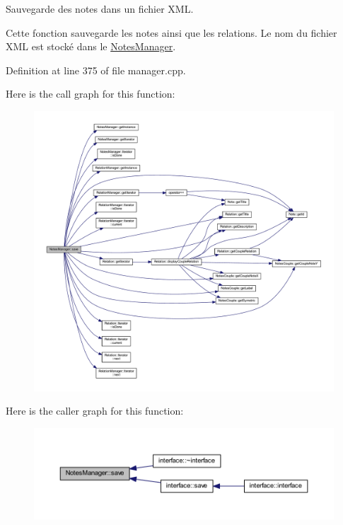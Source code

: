 Sauvegarde des notes dans un fichier X\+ML. 

Cette fonction sauvegarde les notes ainsi que les relations. Le nom du fichier X\+ML est stocké dans le \hyperlink{class_notes_manager}{Notes\+Manager}. 

Definition at line 375 of file manager.\+cpp.

Here is the call graph for this function\+:
\nopagebreak
\begin{figure}[H]
\begin{center}
\leavevmode
\includegraphics[width=350pt]{class_notes_manager_ad271bd7f8079b01b04a32b886b498bac_cgraph}
\end{center}
\end{figure}
Here is the caller graph for this function\+:
\nopagebreak
\begin{figure}[H]
\begin{center}
\leavevmode
\includegraphics[width=350pt]{class_notes_manager_ad271bd7f8079b01b04a32b886b498bac_icgraph}
\end{center}
\end{figure}
\mbox{\label{class_notes_manager_a76c059043681ec4c41d91e75e06ea353}} 

